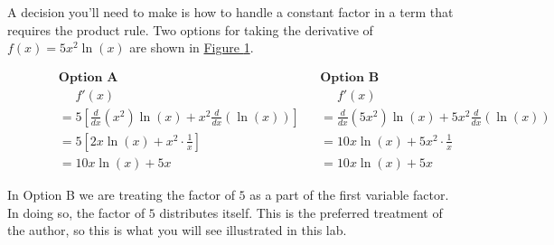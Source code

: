 \documentclass[10pt,oneside,]{book}
\theoremstyle{plain}
\theoremstyle{definition}
\numberwithin{equation}{section}
\newcommand{\fe}[2]{#1\mathopen{}\left(#2\right)\mathclose{}}
\newcommand{\fd}[1]{#1'}
\newcommand{\lzoo}[2]{{\frac{d}{d#1}}{\left(#2\right)}}
\begin{document}
\par
A decision you'll need to make is how to handle a constant factor in a term that requires the product rule.  Two options for taking the derivative of \(\fe{f}{x}=5x^2\fe{\ln}{x}\) are shown in \hyperref[figure-constant-factors-with-product-rule]{Figure \ref{figure-constant-factors-with-product-rule}}.%
\begin{figure}
\centering
\begin{align*}
&\textbf{Option A}&&\textbf{Option B}\\
&\phantom{{}={}}\fe{\fd{f}}{x}&&\phantom{{}={}}\fe{\fd{f}}{x}\\
&=5\left[\lzoo{x}{x^2}\fe{\ln}{x}+x^2\lzoo{x}{\fe{\ln}{x}}\right]&&=\lzoo{x}{5x^2}\fe{\ln}{x}+5x^2\lzoo{x}{\fe{\ln}{x}}\\
&=5\left[2x\fe{\ln}{x}+x^2\cdot\frac{1}{x}\right]&&=10x\fe{\ln}{x}+5x^2\cdot\frac{1}{x}\\
&=10x\fe{\ln}{x}+5x&&=10x\fe{\ln}{x}+5x
\end{align*}%
\caption{\label{figure-constant-factors-with-product-rule}}
\end{figure}
\par
In Option B we are treating the factor of \(5\) as a part of the first variable factor.  In doing so, the factor of \(5\) distributes itself.  This is the preferred treatment of the author, so this is what you will see illustrated in this lab.%
\typeout{************************************************}
\typeout{************************************************}
\end{document}
